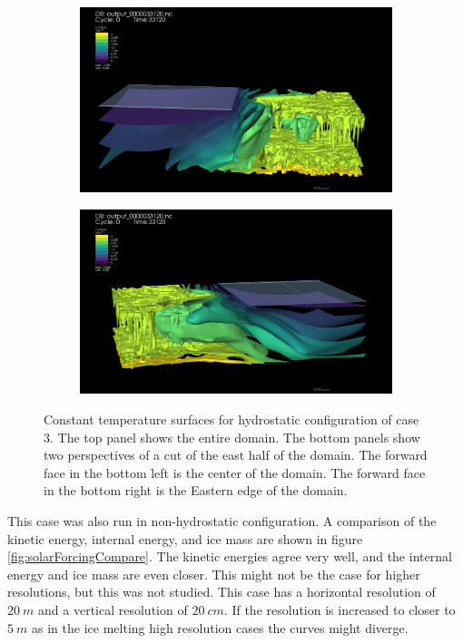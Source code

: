 \documentclass[11pt]{article}
\begin{document}
\begin{figure}[h!]
\begin{subfigure}{0.49\linewidth}
\includegraphics[width=\linewidth]{solarForcing/solarforcing-section01}
\end{subfigure}
\begin{subfigure}{0.49\linewidth}
\includegraphics[width=\linewidth]{solarForcing/solarforcing-section02}
\end{subfigure}
\caption{Constant temperature surfaces for hydrostatic configuration of case 3. The top panel shows the entire domain. The bottom panels show two perspectives of a cut of the east half of the domain. The forward face in the bottom left is the center of the domain. The forward face in the bottom right is the Eastern edge of the domain.}
\label{fig:solarForcingConstantT}
\end{figure}

This case was also run in non-hydrostatic configuration. A comparison of the kinetic energy, internal energy, and ice mass are shown in figure \ref{fig:solarForcingCompare}. The kinetic energies agree very well, and the internal energy and ice mass are even closer. This might not be the case for higher resolutions, but this was not studied. This case has a horizontal resolution of $\SI{20}{m}$ and a vertical resolution of $\SI{20}{cm}$. If the resolution is increased to closer to $\SI{5}{m}$ as in the ice melting high resolution cases the curves might diverge.
\end{document}
